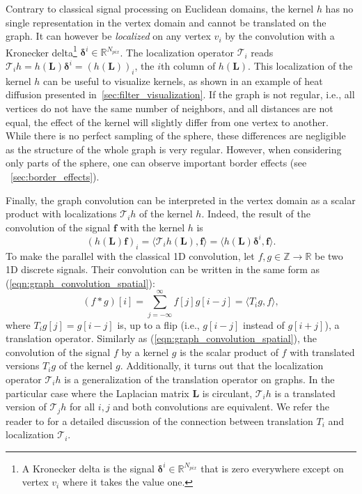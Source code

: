 \documentclass[final,twocolumn,3p,times,sort&compress]{elsarticle}
\newcommand{\eqnref}[1]{(\ref{eqn:#1})}
\renewcommand{\b}[1]{{\bm{#1}}}   %
\newcommand{\1}{\b{1}}              %
\newcommand{\0}{\b{0}}              %
\renewcommand{\L}{\b{L}}
\newcommand{\f}{\b{f}}
\newcommand{\R}{\mathbb{R}}
\newcommand{\T}{\mathcal{T}}
\begin{document}
Contrary to classical signal processing on Euclidean domains, the kernel $h$ has no single representation in the vertex domain and cannot be translated on the graph. It can however be \textit{localized} on any vertex $v_i$ by the convolution with a Kronecker delta\footnote{A Kronecker delta is the signal $\b \delta^i \in \R^{N_{pix}}$ that is zero everywhere except on vertex $v_i$ where it takes the value one.} $\b \delta^i \in \R^{N_{pix}}$. The localization operator $\T_i$ reads $\T_i h = h(\L) \b \delta^i = (h(\L))_i$, the $i$th column of $h(\L)$.
This localization of the kernel $h$ can be useful to visualize kernels, as shown in an example of heat diffusion presented in~\ref{sec:filter_visualization}.
If the graph is not regular, i.e., all vertices do not have the same number of neighbors, and all distances are not equal, the effect of the kernel will slightly differ from one vertex to another. While there is no perfect sampling of the sphere, these differences are negligible as the structure of the whole graph is very regular. However, when considering only parts of the sphere, one can observe important border effects (see ~\ref{sec:border_effects}).

Finally, the graph convolution can be interpreted in the vertex domain as a scalar product with localizations $\T_i h$ of the kernel $h$. Indeed, the result of the convolution of the signal $\f$ with the kernel $h$ is
\begin{equation} \label{eqn:graph_convolution_spatial}
	(h(\L) \f)_i = \langle \T_i h(\L), \f \rangle = \langle h(\L) \b \delta^i, \f \rangle.
\end{equation}
To make the parallel with the classical 1D convolution, let $f, g\in \mathbb{Z} \rightarrow \mathbb{R}$ be two 1D discrete signals. Their convolution can be written in the same form as \eqnref{graph_convolution_spatial}:
\begin{equation*}
	(f \ast g) [i] = \sum_{j=-\infty}^\infty f[j] g[i-j] = \langle T_i g,  f \rangle,
\end{equation*}
where $T_i g[j] = g[i-j]$ is, up to a flip (i.e., $g[i-j]$ instead of $g[i+j]$), a translation operator.
Similarly as \eqnref{graph_convolution_spatial}, the convolution of the signal $f$ by a kernel $g$ is the scalar product of $f$ with translated versions $T_i g$ of the kernel $g$.
Additionally, it turns out that the localization operator $\T_i h$ is a generalization of the translation operator on graphs. In the particular case where the Laplacian matrix $\L$ is circulant, $\T_i h$ is a translated version of $\T_j h$ for all $i, j$ and both convolutions are equivalent. We refer the reader to \citep[Sec 2.2]{perraudin2017stationary} for a detailed discussion of the connection between translation $T_i$ and localization $\T_i$.
\end{document}

